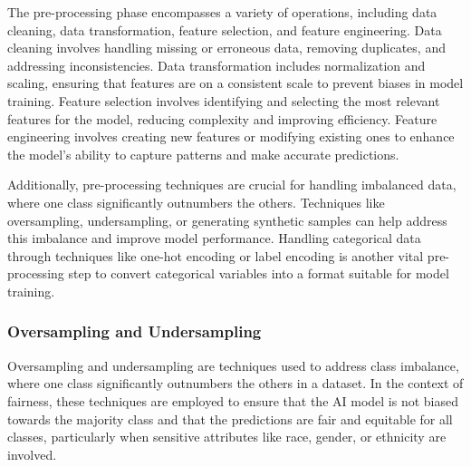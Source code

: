 \documentclass[12pt,a4paper,openright,twoside]{book}
\begin{document}
The pre-processing phase encompasses a variety of operations, including data cleaning, data transformation, feature selection, and feature engineering. Data cleaning involves handling missing or erroneous data, removing duplicates, and addressing inconsistencies. Data transformation includes normalization and scaling, ensuring that features are on a consistent scale to prevent biases in model training. Feature selection involves identifying and selecting the most relevant features for the model, reducing complexity and improving efficiency. Feature engineering involves creating new features or modifying existing ones to enhance the model's ability to capture patterns and make accurate predictions. 

Additionally, pre-processing techniques are crucial for handling imbalanced data, where one class significantly outnumbers the others. Techniques like oversampling, undersampling, or generating synthetic samples can help address this imbalance and improve model performance. Handling categorical data through techniques like one-hot encoding or label encoding is another vital pre-processing step to convert categorical variables into a format suitable for model training.

\subsubsection{Oversampling and Undersampling}

Oversampling and undersampling are techniques used to address class imbalance, where one class significantly outnumbers the others in a dataset. In the context of fairness, these techniques are employed to ensure that the AI model is not biased towards the majority class and that the predictions are fair and equitable for all classes, particularly when sensitive attributes like race, gender, or ethnicity are involved. \cite{9442706}
\end{document}

